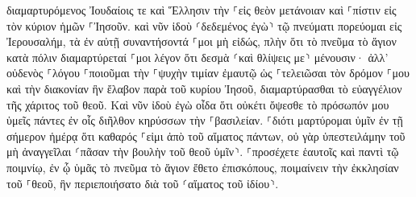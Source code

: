 \documentclass{openreader}
\begin{document}
διαμαρτυρόμενος Ἰουδαίοις τε καὶ Ἕλλησιν τὴν ⸀εἰς θεὸν μετάνοιαν καὶ ⸀πίστιν εἰς τὸν κύριον ἡμῶν ⸀Ἰησοῦν. 
καὶ νῦν ἰδοὺ ⸂δεδεμένος ἐγὼ⸃ τῷ πνεύματι πορεύομαι εἰς Ἰερουσαλήμ, τὰ ἐν αὐτῇ συναντήσοντά ⸀μοι μὴ εἰδώς, 
πλὴν ὅτι τὸ πνεῦμα τὸ ἅγιον κατὰ πόλιν διαμαρτύρεταί ⸀μοι λέγον ὅτι δεσμὰ ⸂καὶ θλίψεις με⸃ μένουσιν· 
ἀλλ’ οὐδενὸς ⸀λόγου ⸀ποιοῦμαι τὴν ⸀ψυχὴν τιμίαν ἐμαυτῷ ὡς ⸀τελειῶσαι τὸν δρόμον ⸀μου καὶ τὴν διακονίαν ἣν ἔλαβον παρὰ τοῦ κυρίου Ἰησοῦ, διαμαρτύρασθαι τὸ εὐαγγέλιον τῆς χάριτος τοῦ θεοῦ. 
Καὶ νῦν ἰδοὺ ἐγὼ οἶδα ὅτι οὐκέτι ὄψεσθε τὸ πρόσωπόν μου ὑμεῖς πάντες ἐν οἷς διῆλθον κηρύσσων τὴν ⸀βασιλείαν. 
⸀διότι μαρτύρομαι ὑμῖν ἐν τῇ σήμερον ἡμέρᾳ ὅτι καθαρός ⸀εἰμι ἀπὸ τοῦ αἵματος πάντων, 
οὐ γὰρ ὑπεστειλάμην τοῦ μὴ ἀναγγεῖλαι ⸂πᾶσαν τὴν βουλὴν τοῦ θεοῦ ὑμῖν⸃. 
⸀προσέχετε ἑαυτοῖς καὶ παντὶ τῷ ποιμνίῳ, ἐν ᾧ ὑμᾶς τὸ πνεῦμα τὸ ἅγιον ἔθετο ἐπισκόπους, ποιμαίνειν τὴν ἐκκλησίαν τοῦ ⸀θεοῦ, ἣν περιεποιήσατο διὰ τοῦ ⸂αἵματος τοῦ ἰδίου⸃. 
\end{document}
